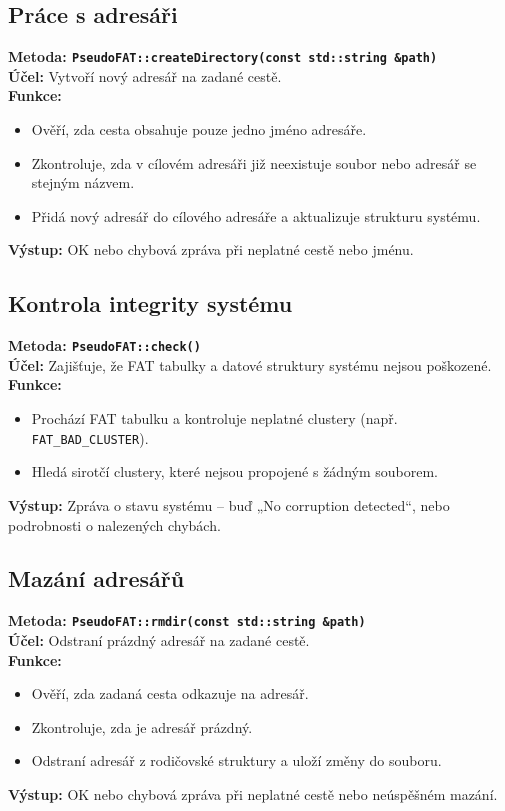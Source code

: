 \documentclass[12pt, a4paper]{article}
\begin{document}
\subsection{Práce s adresáři}
\textbf{Metoda: \texttt{PseudoFAT::createDirectory(const std::string \&path)}} \\
\textbf{Účel:} Vytvoří nový adresář na zadané cestě. \\
\textbf{Funkce:}
\begin{itemize}
    \item Ověří, zda cesta obsahuje pouze jedno jméno adresáře.
    \item Zkontroluje, zda v cílovém adresáři již neexistuje soubor nebo adresář se stejným názvem.
    \item Přidá nový adresář do cílového adresáře a aktualizuje strukturu systému.
\end{itemize}
\textbf{Výstup:} OK nebo chybová zpráva při neplatné cestě nebo jménu.

\subsection{Kontrola integrity systému}
\textbf{Metoda: \texttt{PseudoFAT::check()}} \\
\textbf{Účel:} Zajišťuje, že FAT tabulky a datové struktury systému nejsou poškozené. \\
\textbf{Funkce:}
\begin{itemize}
    \item Prochází FAT tabulku a kontroluje neplatné clustery (např. \texttt{FAT\_BAD\_CLUSTER}).
    \item Hledá sirotčí clustery, které nejsou propojené s žádným souborem.
\end{itemize}
\textbf{Výstup:} Zpráva o stavu systému – buď „No corruption detected“, nebo podrobnosti o nalezených chybách.

\subsection{Mazání adresářů}
\textbf{Metoda: \texttt{PseudoFAT::rmdir(const std::string \&path)}} \\
\textbf{Účel:} Odstraní prázdný adresář na zadané cestě. \\
\textbf{Funkce:}
\begin{itemize}
    \item Ověří, zda zadaná cesta odkazuje na adresář.
    \item Zkontroluje, zda je adresář prázdný.
    \item Odstraní adresář z rodičovské struktury a uloží změny do souboru.
\end{itemize}
\textbf{Výstup:} OK nebo chybová zpráva při neplatné cestě nebo neúspěšném mazání.
\end{document}
